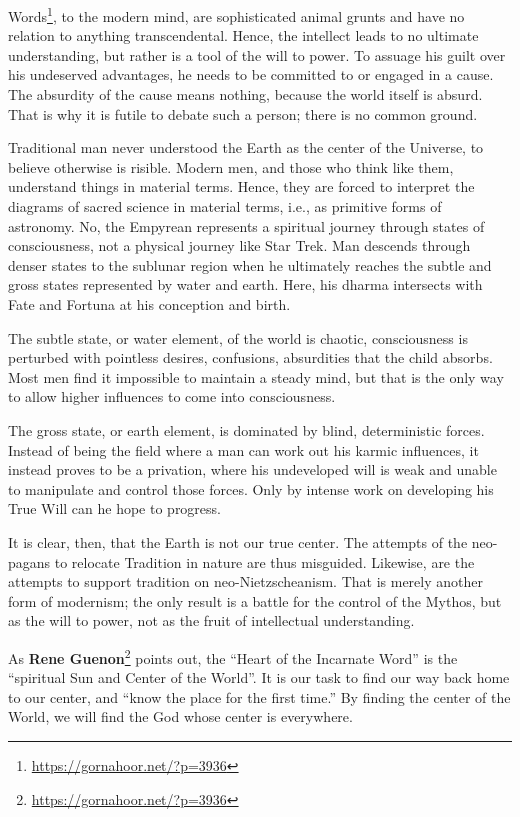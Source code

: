 Words\footnote{\url{https://gornahoor.net/?p=3936}}, to the modern mind, are sophisticated animal grunts and have no relation to anything transcendental. Hence, the intellect leads to no ultimate understanding, but rather is a tool of the will to power. To assuage his guilt over his undeserved advantages, he needs to be committed to or engaged in a cause. The absurdity of the cause means nothing, because the world itself is absurd. That is why it is futile to debate such a person; there is no common ground.

Traditional man never understood the Earth as the center of the Universe, to believe otherwise is risible. Modern men, and those who think like them, understand things in material terms. Hence, they are forced to interpret the diagrams of sacred science in material terms, i.e., as primitive forms of astronomy. No, the Empyrean represents a spiritual journey through states of consciousness, not a physical journey like Star Trek. Man descends through denser states to the sublunar region when he ultimately reaches the subtle and gross states represented by water and earth. Here, his dharma intersects with Fate and Fortuna at his conception and birth.

The subtle state, or water element, of the world is chaotic, consciousness is perturbed with pointless desires, confusions, absurdities that the child absorbs. Most men find it impossible to maintain a steady mind, but that is the only way to allow higher influences to come into consciousness.

The gross state, or earth element, is dominated by blind, deterministic forces. Instead of being the field where a man can work out his karmic influences, it instead proves to be a privation, where his undeveloped will is weak and unable to manipulate and control those forces. Only by intense work on developing his True Will can he hope to progress.

It is clear, then, that the Earth is not our true center. The attempts of the neo-pagans to relocate Tradition in nature are thus misguided. Likewise, are the attempts to support tradition on neo-Nietzscheanism. That is merely another form of modernism; the only result is a battle for the control of the Mythos, but as the will to power, not as the fruit of intellectual understanding.

As \textbf{Rene Guenon}\footnote{\url{https://gornahoor.net/?p=3936}} points out, the ``Heart of the Incarnate Word'' is the ``spiritual Sun and Center of the World''. It is our task to find our way back home to our center, and ``know the place for the first time.'' By finding the center of the World, we will find the God whose center is everywhere.


